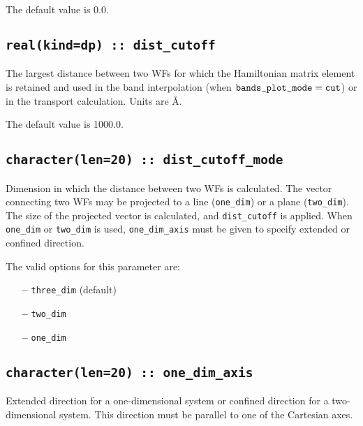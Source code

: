 
The default value is 0.0.

\subsection[dist\_cutoff]{\tt real(kind=dp) :: dist\_cutoff}

The largest distance between two WFs for which
the Hamiltonian matrix element is retained and used in
the band interpolation (when $\verb#bands_plot_mode#=\verb#cut#$)
or in the transport calculation. Units are \AA. 

The default value is 1000.0.

\subsection[dist\_cutoff\_mode]{\tt character(len=20) :: dist\_cutoff\_mode}

Dimension in which the distance between two WFs is calculated.
The vector connecting two WFs may be projected
to a line (\verb#one_dim#) or a plane (\verb#two_dim#).
The size of the projected vector 
is calculated, and \verb#dist_cutoff# is applied.
When \verb#one_dim# or \verb#two_dim#
is used, \verb#one_dim_axis# must be given
to specify extended or confined direction.

The valid options for this parameter are:
\begin{itemize}
\item[{\bf --}] \verb#three_dim#  (default)
\item[{\bf --}] \verb#two_dim#  
\item[{\bf --}] \verb#one_dim# 
\end{itemize}

\subsection[one\_dim\_axis]{\tt character(len=20) :: one\_dim\_axis}

Extended direction for a one-dimensional system
or confined direction for a two-dimensional system.
This direction must be parallel to one of the Cartesian axes.

